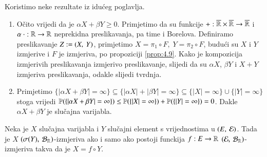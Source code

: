 \begin{rj}[\ref{zad:3.19}]
    Koristimo neke rezultate iz idu\' ceg poglavlja.
    \begin{enumerate}[label=(\roman*)]
        \item O\v cito vrijedi da je $\alpha X + \beta Y \geq 0$.
        Primjetimo da su funkcije $+ : \overline{\mathbb{R}} \times \overline{\mathbb{R}} \to \overline{\mathbb{R}}$ i $\alpha \: \cdot : \mathbb{R} \to \mathbb{R}$ neprekidna preslikavanja, pa time i Borelova.
        Definiramo preslikavanje $Z := ({X}, \: {Y})$, primjetimo $X = \pi_1 \circ F, \; Y = \pi_2 \circ F$, budu\' ci su $X$ i $Y$ izmjerive i $F$ je izmjeriva, po propoziciji \ref{prop:4.9}.
        Kako je kompozicija izmjerivih preslikavanja izmjerivo preslikavanje, slijedi da su $\alpha X$, $\beta Y$ i $X + Y$ izmjeriva preslikavanja, odakle slijedi tvrdnja.
        \item Primjetimo $\{ | \alpha X + \beta Y | = \infty \} \subseteq \{ |\alpha X| + |\beta Y| = \infty \} \subseteq \{|X| = \infty\} \cup \{ |Y| = \infty \}$ stoga vrijedi $\mathbb{P}({ \{ | \alpha X + \beta Y | = \infty \} }) \leq \mathbb{P}({\{|X| = \infty\}}) + \mathbb{P}({\{|Y| = \infty\}}) = 0$.
        Dakle $\alpha X + \beta Y$ je slu\v cajna varijabla.
    \end{enumerate}
\end{rj}

\begin{zad} \label{zad:3.20}
    Neka je $X$ slu\v cajna varijabla i $Y$ slu\v cajni element s vrijednostima u $(E, \: \mathcal{E})$.
    Tada je $X$ $(\sigma({Y}), \: \mathcal{B}_{\mathbb{R}})$-izmjeriva ako i samo ako postoji funckija $f: E \to \mathbb{R}$ $(\mathcal{E}, \: \mathcal{B}_{\mathbb{R}})$-izmjeriva takva da je $X = f \circ Y$.
\end{zad}

%
%

